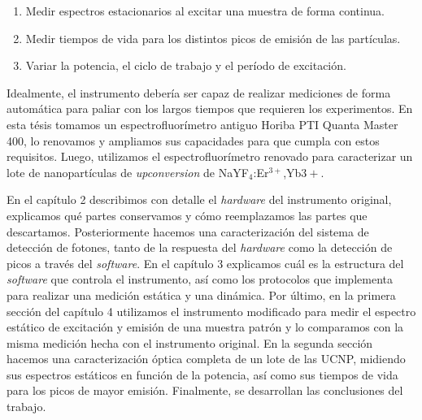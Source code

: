 \begin{enumerate}
    \item Medir espectros estacionarios al excitar una muestra de forma continua.
    \item Medir tiempos de vida para los distintos picos de emisión de las partículas.
    \item Variar la potencia, el ciclo de trabajo y el período de excitación.
\end{enumerate}

\noindent Idealmente, el instrumento debería ser capaz de realizar mediciones de forma automática para paliar con los largos tiempos que requieren los experimentos.
En esta tésis tomamos un espectrofluorímetro antiguo Horiba PTI Quanta Master 400, lo renovamos y ampliamos sus capacidades para que cumpla con estos requisitos.
Luego, utilizamos el espectrofluorímetro renovado para caracterizar un lote de nanopartículas de \textit{upconversion} de NaYF$_4$:Er$^{3+}$,Yb${3+}$.

En el capítulo 2 describimos con detalle el \textit{hardware} del instrumento original, explicamos qué partes conservamos y cómo reemplazamos las partes que descartamos.
Posteriormente hacemos una caracterización del sistema de detección de fotones, tanto de la respuesta del \textit{hardware} como la detección de picos a través del \textit{software}.
En el capítulo 3 explicamos cuál es la estructura del \textit{software} que controla el instrumento, así como los protocolos que implementa para realizar una medición estática y una dinámica.
Por último, en la primera sección del capítulo 4 utilizamos el instrumento modificado para medir el espectro estático de excitación y emisión de una muestra patrón y lo comparamos con la misma medición hecha con el instrumento original.
En la segunda sección hacemos una caracterización óptica completa de un lote de las UCNP, midiendo sus espectros estáticos en función de la potencia, así como sus tiempos de vida para los picos de mayor emisión.
Finalmente, se desarrollan las conclusiones del trabajo.

